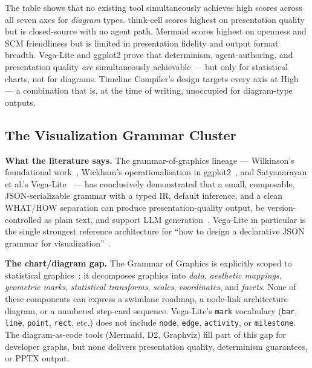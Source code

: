 \noindent
The table shows that no existing tool simultaneously achieves high scores
across all seven axes for \emph{diagram} types.
think-cell scores highest on presentation quality but is closed-source with
no agent path.
Mermaid scores highest on openness and SCM friendliness but is limited in
presentation fidelity and output format breadth.
Vega-Lite and ggplot2 prove that determinism, agent-authoring, and
presentation quality \emph{are} simultaneously achievable --- but only for
statistical charts, not for diagrams.
Timeline Compiler's design targets every axis at High --- a combination that
is, at the time of writing, unoccupied for diagram-type outputs.

\subsection{The Visualization Grammar Cluster}
\label{sec:comparison-viz-grammar}

\textbf{What the literature says.}
The grammar-of-graphics lineage --- Wilkinson's foundational
work~\cite{grammarofgraphics2005}, Wickham's operationalisation in
ggplot2~\cite{layeredgrammar2010}, and Satyanarayan et al.'s
Vega-Lite~\cite{vegalite2017} --- has conclusively demonstrated that a
small, composable, JSON-serializable grammar with a typed IR, default
inference, and a clean WHAT/HOW separation can produce presentation-quality
output, be version-controlled as plain text, and support LLM
generation~\cite{narechania2021nl4dv}.
Vega-Lite in particular is the single strongest reference architecture for
``how to design a declarative JSON grammar for
visualization''~\cite{vegalite2017}.

\medskip\noindent
\textbf{The chart/diagram gap.}
The Grammar of Graphics is explicitly scoped to statistical
graphics~\cite{grammarofgraphics2005}: it decomposes graphics into
\emph{data}, \emph{aesthetic mappings}, \emph{geometric marks},
\emph{statistical transforms}, \emph{scales}, \emph{coordinates}, and
\emph{facets}.
None of these components can express a swimlane roadmap, a node-link
architecture diagram, or a numbered step-card sequence.
Vega-Lite's \texttt{mark} vocabulary (\texttt{bar}, \texttt{line},
\texttt{point}, \texttt{rect}, etc.) does not include \texttt{node},
\texttt{edge}, \texttt{activity}, or \texttt{milestone}.
The diagram-as-code tools (Mermaid, D2, Graphviz) fill part of this gap
for developer graphs, but none delivers presentation quality,
determinism guarantees, or PPTX output.

